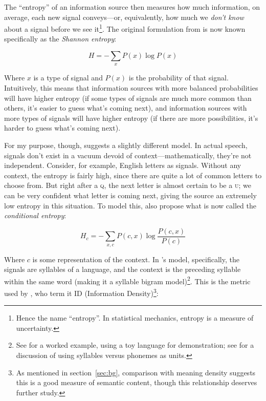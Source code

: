 \documentclass[12pt,twoside]{article}
\begin{document}
The ``entropy'' of an information source then measures how much information, on average, each new signal conveys---or, equivalently, how much we \emph{don't know} about a signal before we see it\footnote{Hence the name ``entropy''. In statistical mechanics, entropy is a measure of uncertainty.}. The original formulation from \citet[50]{shannon} is now known specifically as the \emph{Shannon entropy}: %

\begin{equation}
\label{eqn:shannon}
H = - \sum_x P(x) \log P(x)
\end{equation}

Where \(x\) is a type of signal and \(P(x)\) is the probability of that signal. Intuitively, this means that information sources with more balanced probabilities will have higher entropy (if some types of signals are much more common than others, it's easier to guess what's coming next), and information sources with more types of signals will have higher entropy (if there are more possibilities, it's harder to guess what's coming next).

For my purpose, though, \citet{oh} suggests a slightly different model. In actual speech, signals don't exist in a vacuum devoid of context---mathematically, they're not independent. Consider, for example, English letters as signals. Without any context, the entropy is fairly high, since there are quite a lot of common letters to choose from. But right after a \textsc{q}, the next letter is almost certain to be a \textsc{u}; we can be very confident what letter is coming next, giving the source an extremely low entropy in this situation. To model this, \citet[52]{shannon} also propose what is now called the \emph{conditional entropy}: %

\begin{equation}
H_c = - \sum_{x,c} P(c,x) \log \frac{P(c,x)}{P(c)}
\end{equation}

Where \(c\) is some representation of the context. In \citeauthor{oh}'s model, specifically, the signals are syllables of a language, and the context is the preceding syllable within the same word (making it a syllable bigram model)\footnote{See \cite[41]{oh} for a worked example, using a toy language for demonstration; see \cite[545]{pellegrino} for a discussion of using syllables versus phonemes as units.}. This is the metric used by \citet{coupé}, who term it ID (Information Density)\footnote{As mentioned in section~\ref{sec:bg}, comparison with  meaning density suggests this is a good measure of semantic content, though this relationship deserves further study.}:
\end{document}
